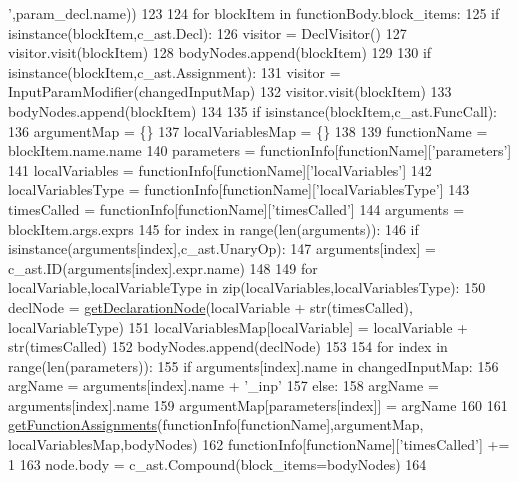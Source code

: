 \begin{DoxyCode}
{      '},param\_decl.name))
123     
124     \textcolor{keywordflow}{for} blockItem \textcolor{keywordflow}{in} functionBody.block\_items:
125         \textcolor{keywordflow}{if} isinstance(blockItem,c\_ast.Decl):
126             visitor = DeclVisitor()
127             visitor.visit(blockItem)
128             bodyNodes.append(blockItem)
129         
130         \textcolor{keywordflow}{if} isinstance(blockItem,c\_ast.Assignment):
131             visitor = InputParamModifier(changedInputMap)
132             visitor.visit(blockItem)
133             bodyNodes.append(blockItem)
134 
135         \textcolor{keywordflow}{if} isinstance(blockItem,c\_ast.FuncCall):
136             argumentMap = \{\}
137             localVariablesMap = \{\}
138             
139             functionName = blockItem.name.name
140             parameters = functionInfo[functionName][\textcolor{stringliteral}{'parameters'}]
141             localVariables = functionInfo[functionName][\textcolor{stringliteral}{'localVariables'}]
142             localVariablesType = functionInfo[functionName][\textcolor{stringliteral}{'localVariablesType'}]
143             timesCalled = functionInfo[functionName][\textcolor{stringliteral}{'timesCalled'}]
144             arguments = blockItem.args.exprs
145             \textcolor{keywordflow}{for} index \textcolor{keywordflow}{in} range(len(arguments)):
146                 \textcolor{keywordflow}{if} isinstance(arguments[index],c\_ast.UnaryOp):
147                     arguments[index] = c\_ast.ID(arguments[index].expr.name)
148 
149             \textcolor{keywordflow}{for} localVariable,localVariableType \textcolor{keywordflow}{in} zip(localVariables,localVariablesType):
150                 declNode = \hyperlink{namespaceastNodes_ae5e5c7f09a1586002b20db6d72f6d30b}{getDeclarationNode}(localVariable + str(timesCalled),
      localVariableType)
151                 localVariablesMap[localVariable] = localVariable + str(timesCalled)
152                 bodyNodes.append(declNode)
153             
154             \textcolor{keywordflow}{for} index \textcolor{keywordflow}{in} range(len(parameters)):
155                 \textcolor{keywordflow}{if} arguments[index].name \textcolor{keywordflow}{in} changedInputMap:
156                     argName = arguments[index].name + \textcolor{stringliteral}{'\_inp'}
157                 \textcolor{keywordflow}{else}:
158                     argName = arguments[index].name
159                 argumentMap[parameters[index]] = argName
160             
161             \hyperlink{namespaceutils_a04fa4bbfa41595f584571fb61a6047c5}{getFunctionAssignments}(functionInfo[functionName],argumentMap,
      localVariablesMap,bodyNodes)
162             functionInfo[functionName][\textcolor{stringliteral}{'timesCalled'}] += 1
163     node.body = c\_ast.Compound(block\_items=bodyNodes)
164 
\end{DoxyCode}
